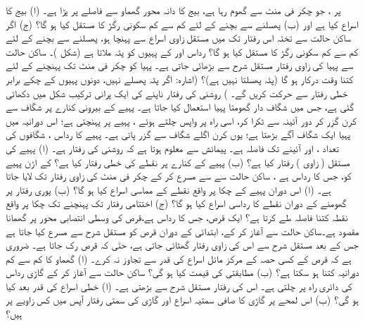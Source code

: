     پر ، جو  چکر فی منٹ سے گھوم رہا ہے،   بیج  کا دانہ  محور گھماو سے  فاصلے پر پڑا ہے۔ (ا) بیج کا اسراع کیا ہے اور (ب) پھسلنے سے بچنے کے لئے   کم سے کم سکونی رگڑ کا مستقل  کیا ہو گا؟ (ج)  اگر ساکن حالت سے تختہ  اس رفتار تک  میں مستقل زاوی  اسراع سے پہنچا ہو،  پھسلنے سے  بچنے کے لئے کم سے کم  سکونی رگڑ کا مستقل کیا ہو گا؟
رداس  اور   کے پہیوں  کو  پٹہ  ملاتا  ہے (شکل )۔ ساکن حالت سے پہیا  کی زاوی  رفتار   مستقل شرح سے بڑھائی جاتی ہے۔ پہیا  کو  چکر فی منٹ تک پہنچنے کے لئے کتنا وقت درکار ہو گا (پٹہ پھسلتا نہیں ہے)؟  (اشارہ: اگر پٹہ پھسلے نہیں، دونوں پہیوں کے چکے برابر خطی  رفتار سے حرکت کریں گے۔ )
روشنی کی رفتار ناپنے کی ایک پرانی ترکیب شکل  میں دکھائی گئی ہے، جس میں  شگاف دار  گھومتا  پہیا استعمال کیا جاتا ہے۔ پہیے کے بیرونی کنارے پر   شگاف  سے کرن  گزر کر دور آئینہ   سے ٹکرا کر،  اسی راہ پر واپس  چلتے ہوئے ،   پہیے  پر پہنچتی ہے؛ اس دورانیہ میں پہیا ایک  شگاف  آگے بڑھتا ہے؛ یوں کرن اگلے شگاف سے گزر پاتی ہے۔ پہیے کا رداس ، شگافوں کی تعداد ، اور آئینے تک فاصلہ  ہے۔ پیمائش سے معلوم ہوتا ہے کہ روشنی کی رفتار  ہے۔ (ا) پہیے کی مستقل ( زاوی ) رفتار کیا ہے؟ (ب)  پہیے کے کنارے پر  نقطے کی خطی رفتار کیا ہے؟
 کے اڑن پہیے  کو، جس کا رداس   ہے ، ساکن حالت سے   سے مسرع کر کے  چکر فی منٹ کی زاوی رفتار تک لایا جاتا ہے۔ (ا)  اس دوران    پہیے کے چکا پر  واقع نقطے کے  مماسی اسراع کیا ہو گا؟ (ب)  پوری رفتار پر گھومنے کے دوران نقطے کا رداسی اسراع کیا ہو گا؟ (ج)   اختتامی رفتار تک پہنچنے تک  چکا پر واقع نقطہ کتنا فاصلہ طے کرتا ہے؟
ایک قرص،  جس کا رداس  ہے،قرص کی  وسطی  انتصابی محور  پر  گھمانا مقصود ہے۔ساکن حالت سے آغاز کر کے، ابتدائی   کے دوران قرص کو  مستقل  شرح سے مسرع  کیا جاتا ہے جس کے بعد   مستقل  شرح سے اس کی زاوی رفتار گھٹائی جاتی ہے، حتٰی کہ قرص رک جاتا ہے۔   ضروری ہے کہ قرص کے کسی  حصہ کے مرکز مائل اسراع  کی قدر   سے تجاوز نہ کرے۔ (ا) گھماو کا کم سے کم دورانیہ کتنا ہو سکتا ہے؟ (ب) مطابقتی  کی قیمت کیا ہو گی؟
ساکن حالت سے آغاز کر کے گاڑی  رداس  کی دائری  راہ پر چلتی ہے۔ اس کی رفتار   مستقل شرح سے بڑھتی ہے۔ (ا)   خطی اسراع کی قدر  بعد کیا ہو گی؟ (ب)  اس لمحے پر گاڑی کا صافی سمتیہ  اسراع اور      گاڑی  کی سمتی رفتار   آپس میں کس زاویے پر ہیں؟

